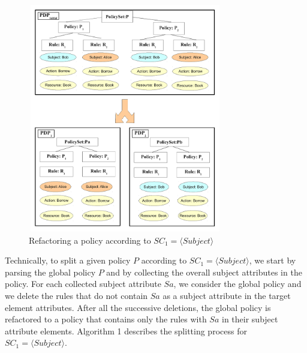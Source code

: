 \begin{figure}[!h]
\begin{center}
\includegraphics[width=8.5cm, height=10cm]{splitting}
\caption{Refactoring a policy according to $SC_{1}=\langle Subject\rangle$}
\label{splitting}
\end{center}
\end{figure}
Technically, to split a given policy $P$ according to $SC_{1}=\langle Subject\rangle$, we start by parsing the global policy $P$ 
and by collecting the overall subject attributes in the policy. For each collected subject attribute $Sa$, we consider the global policy and we 
delete the rules that do not contain $Sa$ as a subject attribute in the target element attributes. After all the successive deletions, the global 
policy is refactored to a policy that contains only the rules with $Sa$ in their subject attribute elements. 
Algorithm 1 describes the splitting process for $SC_{1}=\langle Subject\rangle$.

